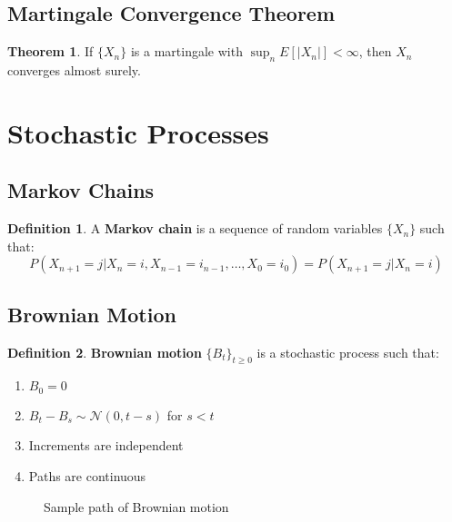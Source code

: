 \documentclass[11pt]{article}
\theoremstyle{definition}
\newtheorem{definition}{Definition}[section]
\newtheorem{theorem}{Theorem}[section]
\begin{document}
\subsection{Martingale Convergence Theorem}
\begin{theorem}
If $\{X_n\}$ is a martingale with $\sup_n E[|X_n|] < \infty$, then $X_n$ converges almost surely.
\end{theorem}

\section{Stochastic Processes}

\subsection{Markov Chains}
\begin{definition}
A \textbf{Markov chain} is a sequence of random variables $\{X_n\}$ such that:
$$P(X_{n+1} = j | X_n = i, X_{n-1} = i_{n-1}, \ldots, X_0 = i_0) = P(X_{n+1} = j | X_n = i)$$
\end{definition}

\subsection{Brownian Motion}
\begin{definition}
\textbf{Brownian motion} $\{B_t\}_{t \geq 0}$ is a stochastic process such that:
\begin{enumerate}
    \item $B_0 = 0$
    \item $B_t - B_s \sim \mathcal{N}(0, t-s)$ for $s < t$
    \item Increments are independent
    \item Paths are continuous
\end{enumerate}
\end{definition}

\begin{figure}[h]
\centering
{}
\caption{Sample path of Brownian motion}
\end{figure}
\end{document}
